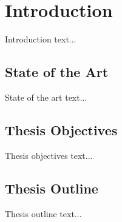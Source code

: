 \chapter{Introduction} \label{chap:introduction}
Introduction text...

\section{State of the Art} \label{sec:state_of_the_art}
State of the art text... \citep{article:perceptron} \citep{article:pruning_algorithms}

\section{Thesis Objectives} \label{sec:thesis_objectives}
Thesis objectives text...

\section{Thesis Outline} \label{sec:thesis_outline}
Thesis outline text...